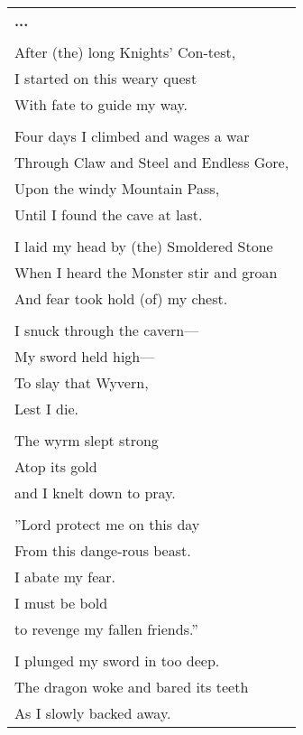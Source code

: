 \documentclass{article}
\begin{document}



\begin{center}
\begin{tabular}{l}
\textbf{...} \\
\\
After (the) long Knights' Con-test, \\
I started on this weary quest \\
With fate to guide my way. \\
\\
Four days I climbed and wages a war \\
Through Claw and Steel and Endless Gore, \\
Upon the windy Mountain Pass, \\
Until I found the cave at last. \\
\\
I laid my head by (the) Smoldered Stone \\
When I heard the Monster stir and groan \\
And fear took hold (of) my chest. \\
\\
I snuck through the cavern--- \\
My sword held high--- \\
To slay that Wyvern, \\
Lest I die. \\
\\
The wyrm slept strong \\
Atop its gold \\
and I knelt down to pray. \\
\\
''Lord protect me on this day \\
From this dange-rous beast. \\
I abate my fear. \\
I must be bold \\
to revenge my fallen friends.'' \\
\\
I plunged my sword in too deep. \\
The dragon woke and bared its teeth \\
As I slowly backed away. \\

\end{tabular}
\end{center}
\end{document}

